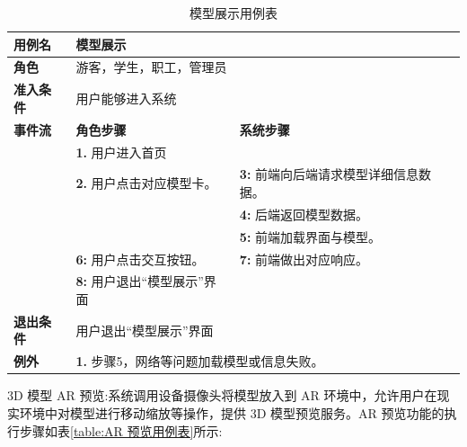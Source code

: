 \begin{table}[H]
  \centering
  \renewcommand\arraystretch{1.1}
  \small
  \caption{模型展示用例表}
  \label{table:模型展示用例表}
  \setlength{\tabcolsep}{4mm}
  \begin{tabular}{|p{2cm}|p{5.75cm}|p{5.75cm}|}
    \hline \textbf{用例名} & \multicolumn{2}{l|}{模型展示} \\
    \hline \textbf{角色} & \multicolumn{2}{l|}{游客，学生，职工，管理员} \\
    \hline \textbf{准入条件} & \multicolumn{2}{l|}{用户能够进入系统} \\
    \hline \textbf{事件流} & \textbf{角色步骤} & \textbf{系统步骤} \\
    \hline \multirow{3}{*}{~} & \textbf{1.} 用户进入首页  &    \\
    \cline{2-3} & \textbf{2.} 用户点击对应模型卡。 & \textbf{3:} 前端向后端请求模型详细信息数据。 \\
    \cline{2-3} &  & \textbf{4:} 后端返回模型数据。 \\
    \cline{2-3} &  & \textbf{5:} 前端加载界面与模型。 \\
    \cline{2-3} & \textbf{6:} 用户点击交互按钮。 & \textbf{7:} 前端做出对应响应。 \\
    \cline{2-3} & \textbf{8:} 用户退出``模型展示''界面 &  \\
    \hline \textbf{退出条件}  & \multicolumn{2}{l|}{用户退出``模型展示''界面} \\
    \hline \multirow{1}{*}{\textbf{例外}} & \multicolumn{2}{l|}{\textbf{1.} 步骤5，网络等问题加载模型或信息失败。} \\
    \hline
  \end{tabular}
\end{table}


3D 模型 AR 预览:系统调用设备摄像头将模型放入到 AR 环境中，允许用户在现实环境中对模型进行移动缩放等操作，提供 3D 模型预览服务。AR 预览功能的执行步骤如表\ref{table:AR 预览用例表}所示:

